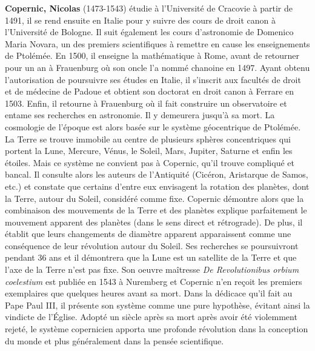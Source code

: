 \textbf{Copernic, Nicolas} (1473-1543) étudie à l'Université de Cracovie à partir de 1491, il se rend ensuite en Italie pour y suivre des cours de droit canon à l'Université de Bologne. Il suit également les cours d'astronomie de Domenico Maria Novara, un des premiers scientifiques à remettre en cause les enseignements de Ptolémée. En 1500, il enseigne la mathématique à Rome, avant de retourner pour un an à Frauenburg où son oncle l'a nommé chanoine en 1497. Ayant obtenu l'autorisation de poursuivre ses études en Italie, il s'inscrit aux facultés de droit et de médecine de Padoue et obtient son doctorat en droit canon à Ferrare en 1503. Enfin, il retourne à Frauenburg où il fait construire un observatoire et entame ses recherches en astronomie. Il y demeurera jusqu'à sa mort. La cosmologie de l'époque est alors basée sur le système géocentrique de Ptolémée. La Terre se trouve immobile au centre de plusieurs sphères concentriques qui portent la Lune, Mercure, Vénus, le Soleil, Mars, Jupiter, Saturne et enfin les étoiles. Mais ce système ne convient pas à Copernic, qu'il trouve compliqué et bancal. Il consulte alors les auteurs de l'Antiquité (Cicéron, Aristarque de Samos, etc.) et constate que certains d'entre eux envisagent la rotation des planètes, dont la Terre, autour du Soleil, considéré comme fixe. Copernic démontre alors que la combinaison des mouvements de la Terre et des planètes explique parfaitement le mouvement apparent des planètes (dans le sens direct et rétrograde). De plus, il établit que leurs changements de diamètre apparent apparaissent comme une conséquence de leur révolution autour du Soleil. Ses recherches se poursuivront pendant 36 ans et il démontrera que la Lune est un satellite de la Terre et que l'axe de la Terre n'est pas fixe. Son oeuvre maîtresse \textit{De Revolutionibus orbium coelestium} est publiée en 1543 à Nuremberg et Copernic n'en reçoit les premiers exemplaires que quelques heures avant sa mort. Dans la dédicace qu'il fait au Pape Paul III, il présente son système comme une pure hypothèse, évitant ainsi la vindicte de l'Église. Adopté un siècle après sa mort après avoir été violemment rejeté, le système copernicien apporta une profonde révolution dans la conception du monde et plus généralement dans la pensée scientifique.

